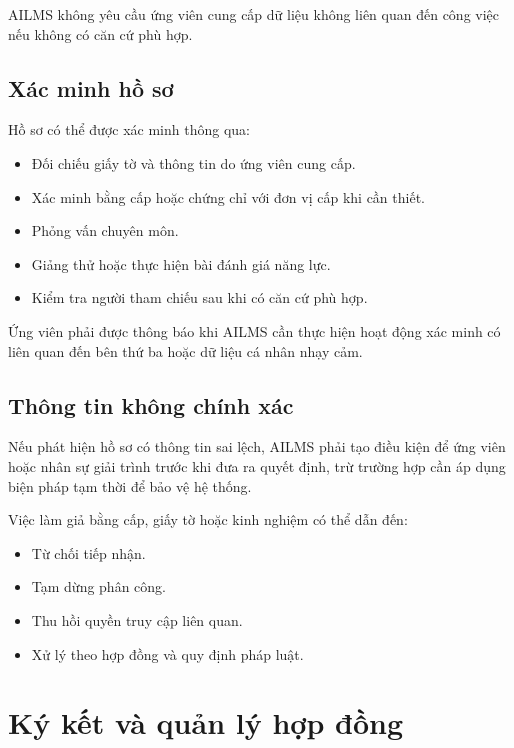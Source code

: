 \documentclass[12pt,a4paper]{article}
\begin{document}
AILMS không yêu cầu ứng viên cung cấp dữ liệu không liên quan đến công việc
nếu không có căn cứ phù hợp.

\subsection{Xác minh hồ sơ}

Hồ sơ có thể được xác minh thông qua:

\begin{itemize}
    \item Đối chiếu giấy tờ và thông tin do ứng viên cung cấp.
    \item Xác minh bằng cấp hoặc chứng chỉ với đơn vị cấp khi cần thiết.
    \item Phỏng vấn chuyên môn.
    \item Giảng thử hoặc thực hiện bài đánh giá năng lực.
    \item Kiểm tra người tham chiếu sau khi có căn cứ phù hợp.
\end{itemize}

Ứng viên phải được thông báo khi AILMS cần thực hiện hoạt động xác minh
có liên quan đến bên thứ ba hoặc dữ liệu cá nhân nhạy cảm.

\subsection{Thông tin không chính xác}

Nếu phát hiện hồ sơ có thông tin sai lệch, AILMS phải tạo điều kiện
để ứng viên hoặc nhân sự giải trình trước khi đưa ra quyết định,
trừ trường hợp cần áp dụng biện pháp tạm thời để bảo vệ hệ thống.

Việc làm giả bằng cấp, giấy tờ hoặc kinh nghiệm có thể dẫn đến:

\begin{itemize}
    \item Từ chối tiếp nhận.
    \item Tạm dừng phân công.
    \item Thu hồi quyền truy cập liên quan.
    \item Xử lý theo hợp đồng và quy định pháp luật.
\end{itemize}

\section{Ký kết và quản lý hợp đồng}
\end{document}
